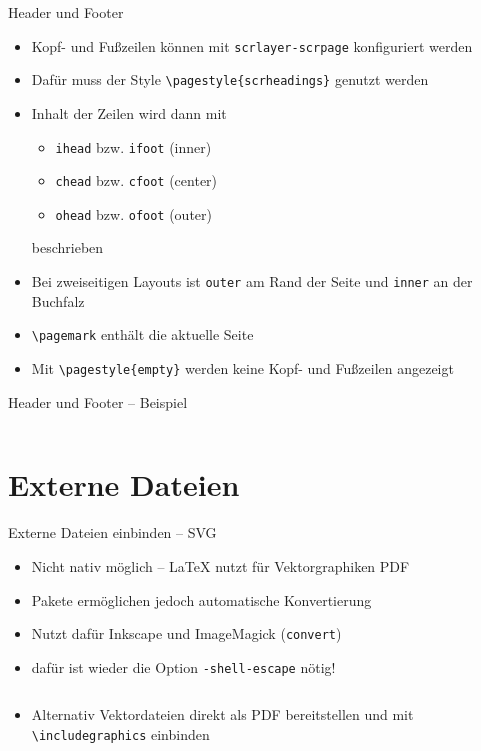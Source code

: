 \documentclass[presentation,aspectratio=169]{beamer}
\begin{document}
\begin{frame}[fragile]{Header und Footer}
  \begin{itemize}
    \item Kopf- und Fußzeilen können mit \verb|scrlayer-scrpage| konfiguriert werden
    \item Dafür muss der Style \verb|\pagestyle{scrheadings}| genutzt werden
    \item Inhalt der Zeilen wird dann mit
      \begin{itemize}
        \item \verb|ihead| bzw. \verb|ifoot| (inner)
        \item \verb|chead| bzw. \verb|cfoot| (center)
        \item \verb|ohead| bzw. \verb|ofoot| (outer)
      \end{itemize}
      beschrieben
    \item Bei zweiseitigen Layouts ist \verb|outer| am Rand der Seite und \verb|inner| an der Buchfalz
    \item \verb|\pagemark| enthält die aktuelle Seite
    \item Mit \verb|\pagestyle{empty}| werden keine Kopf- und Fußzeilen angezeigt
  \end{itemize}
\end{frame}

\begin{frame}[fragile]{Header und Footer -- Beispiel}
  \inputminted{latex}{codebeispiele/header-footer.tex}
\end{frame}

\section{Externe Dateien}

\begin{frame}[fragile]{Externe Dateien einbinden -- SVG}
  \begin{itemize}
    \item Nicht nativ möglich -- \LaTeX{} nutzt für Vektorgraphiken PDF
    \item Pakete ermöglichen jedoch automatische Konvertierung
    \item Nutzt dafür Inkscape und ImageMagick (\verb|convert|)
    \item dafür ist wieder die Option \verb|-shell-escape| nötig!
    \inputminted{latex}{codebeispiele/include-svg.tex}
    \item Alternativ Vektordateien direkt als PDF bereitstellen und mit \verb|\includegraphics| einbinden
  \end{itemize}
\end{frame}
\end{document}
